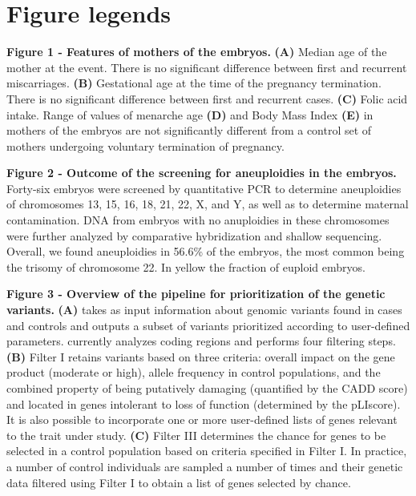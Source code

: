 \section*{Figure legends}


\textbf{Figure 1 - Features of mothers of the embryos.} \textbf{(A)} Median age of the mother at the event. There is no significant difference between first and recurrent miscarriages. \textbf{(B)} Gestational age at the time of the pregnancy termination. There is no significant difference between first and recurrent cases. \textbf{(C)} Folic acid intake. Range of values of menarche age \textbf{(D)} and Body Mass Index \textbf{(E)} in mothers of the embryos are not significantly different from a control set of mothers undergoing voluntary termination of pregnancy.


\textbf{Figure 2 - Outcome of the screening for aneuploidies in the embryos.} Forty-six embryos were screened by quantitative PCR to determine aneuploidies of chromosomes 13, 15, 16, 18, 21, 22, X, and Y, as well as to determine maternal contamination. DNA from embryos with no anuploidies in these chromosomes were further analyzed by comparative hybridization and shallow sequencing. Overall, we found aneuploidies in 56.6\% of the embryos, the most common being the trisomy of chromosome 22. In yellow the fraction of euploid embryos. 

\textbf{Figure 3 - Overview of the pipeline for prioritization of the genetic variants.} \textbf{(A)} \gp takes as input information about genomic variants found in cases and controls and outputs a subset of variants prioritized according to user-defined parameters. \gp currently analyzes coding regions and performs four filtering steps. \textbf{(B)} Filter I retains variants based on three criteria: overall impact on the gene product (moderate or high), allele frequency in control populations, and the combined property of being putatively damaging (quantified by the CADD score) and located in genes intolerant to loss of function (determined by the pLIscore). It is also possible to incorporate one or more user-defined lists of genes relevant to the trait under study. \textbf{(C)} Filter III determines the chance for genes to be selected in a control population based on criteria specified in Filter I. In practice, a number of control individuals are sampled a number of times and their genetic data filtered using Filter I to obtain a list of genes selected by chance.


